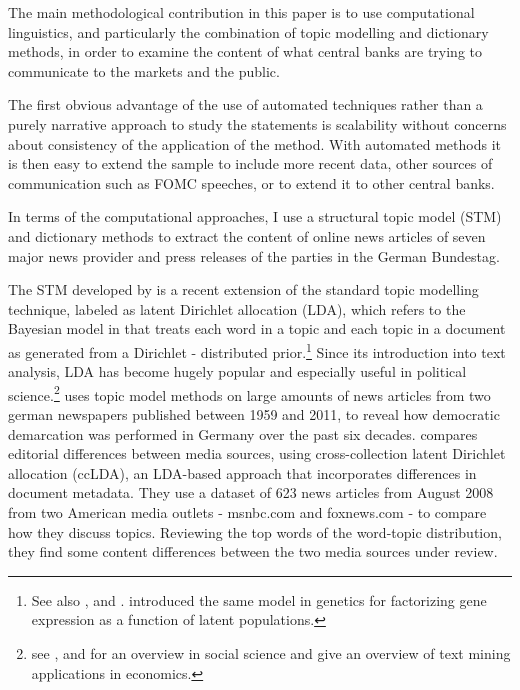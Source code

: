 \documentclass[12pt,a4paper,notitlepage]{article}
\begin{document}
 The main methodological contribution in this paper is to use computational linguistics, and particularly the combination of topic modelling and dictionary methods, in order to examine the content of what central banks are trying to communicate to the markets and the public.

The first obvious advantage of the use of automated techniques rather than a purely narrative approach to study the statements is scalability without concerns about consistency of the application of the method. With automated methods it is then easy to extend the sample to include more recent data, other sources of communication such as FOMC speeches, or to extend it to other central banks.

In terms of the computational approaches, I use a structural topic model (STM) and dictionary methods to extract the content of online news articles of seven major news provider and press releases of the parties in the German Bundestag. 

The STM developed by \citet{roberts_model_2016} is a recent extension of the standard topic modelling technique, labeled as latent Dirichlet allocation (LDA), which refers to the Bayesian model in \citet{blei_latent_2003} that treats each word in a topic and each topic in a document as generated from a Dirichlet - distributed prior.\footnote{See also \citet{griffiths_probabilistic_2002}, \citet{griffiths_finding_2004} and \citet{hofmann_probabilistic_1999}. \citet{pritchard_inference_2000} introduced the same model in genetics for factorizing gene expression as a function of latent populations.} Since its introduction into text analysis, LDA has become hugely popular and especially useful in political science.\footnote{see \citet{blei_probabilistic_2012}, \citet{grimmer_text_2013} and \citet{wiedmann_text_2016} for an overview in social science and \citet{gentzkow_text_2017} give an overview of text mining applications in economics.} \citet{wiedmann_text_2016} uses topic model methods on large amounts of news articles from two german newspapers published between 1959 and 2011, to reveal how democratic demarcation was performed in Germany over the past six decades. \citet{paul_cross-collection_2009} compares editorial differences between media sources, using cross-collection latent Dirichlet allocation (ccLDA), an LDA-based approach that incorporates differences in document metadata. They use a dataset of 623 news articles from August 2008 from two American media outlets - msnbc.com and foxnews.com - to compare how they discuss topics. Reviewing the top words of the word-topic distribution, they find some content differences between the two media sources under review.
\end{document}
